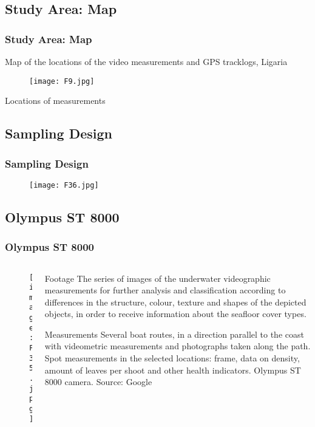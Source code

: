 \documentclass[pdflatex,compress]{beamer}
\begin{document}
\subsection{Study Area: Map}
\begin{frame}\frametitle{Study Area: Map}
\footnotesize{Map of the locations of the video measurements and GPS tracklogs, Ligaria}
\begin{figure}[H]
	\centering
		\texttt{[image: F9.jpg]}
\end{figure}
\scriptsize{Locations of measurements}
\end{frame}

\subsection{Sampling Design}
\begin{frame}\frametitle{Sampling Design}
\begin{figure}[H]
	\centering
		\texttt{[image: F36.jpg]}
\end{figure}
\end{frame}

\subsection{Olympus ST 8000}
\begin{frame}\frametitle{Olympus ST 8000}
\begin{minipage}[0.4\textheight]{\textwidth}
\begin{columns}[T]
\begin{column}{0.5\textwidth}
\begin{figure}[H]
	\centering
		\texttt{[image: F35.jpg]}
\end{figure}
\end{column}
\begin{column}{0.5\textwidth}
\scriptsize{
\begin{alertblock}{Footage}
The series of images of the underwater videographic measurements for further analysis and classification according to differences in the structure, colour, texture and shapes of the depicted objects, in order to receive information about the seafloor cover types.
\end{alertblock}

\begin{block}{Measurements}
Several boat routes, in a direction parallel to the coast with videometric measurements and photographs taken along the path. Spot measurements in the selected locations: frame, data on density, amount of leaves per shoot and other health indicators. Olympus ST 8000 camera. Source: Google
\end{block}}

\end{column}
\end{columns}
\end{minipage}
\end{frame}
\end{document}
